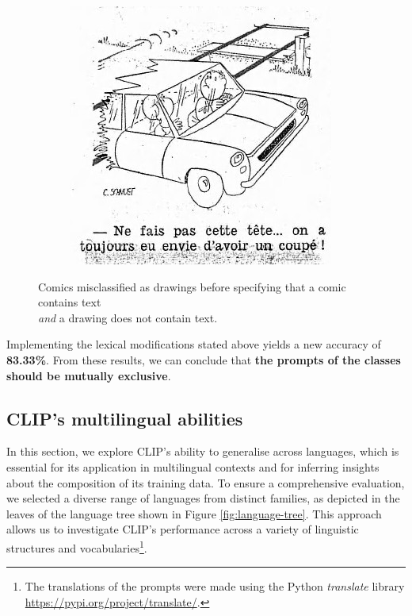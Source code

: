 \begin{figure}[ht]
\begin{subfigure}{0.3\textwidth}
        \includegraphics[width=\linewidth]{Images/IMP-1965-03-13-a-i0144_3.jpg}
    \end{subfigure}

    \caption{Comics misclassified as drawings before specifying that a comic contains text \\ \textit{and} a drawing does not contain text.}
    \label{fig:3.8}
\end{figure} 


Implementing the lexical modifications stated above yields a new accuracy of \textbf{83.33\%}. From these results, we can conclude that \textbf{the prompts of the classes should be mutually exclusive}. 



\subsection{CLIP's multilingual abilities}

In this section, we explore CLIP's ability to generalise across languages, which is essential for its application in multilingual contexts and for inferring insights about the composition of its training data. To ensure a comprehensive evaluation, we selected a diverse range of languages from distinct families, as depicted in the leaves of the language tree shown in Figure \ref{fig:language-tree}. This approach allows us to investigate CLIP's performance across a variety of linguistic structures and vocabularies\footnote{The translations of the prompts were made using the Python \textit{translate} library \url{https://pypi.org/project/translate/}.}.

